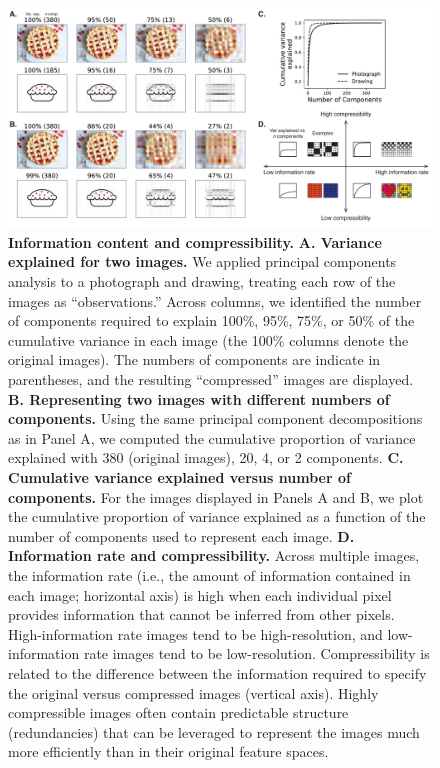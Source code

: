 \documentclass[english]{article}
\begin{document}
\begin{figure}[tp]

  \centering
  \includegraphics[width=\textwidth]{figs/information_and_compressibility}
  
  \caption{\textbf{Information content and compressibility.} \textbf{A. Variance
  explained for two images.} We applied principal components analysis to a
  photograph and drawing, treating each row of the images as ``observations.''
  Across columns, we identified the number of components required to explain
  100\%, 95\%, 75\%, or 50\% of the cumulative variance in each image (the 100\%
  columns denote the original images). The numbers of components are indicate in
  parentheses, and the resulting ``compressed'' images are displayed. \textbf{B.
  Representing two images with different numbers of components.} Using the same
  principal component decompositions as in Panel A, we computed the cumulative
  proportion of variance explained with 380 (original images), 20, 4, or 2
  components. \textbf{C. Cumulative variance explained versus number of
  components.} For the images displayed in Panels A and B, we plot the cumulative
  proportion of variance explained as a function of the number of components used
  to represent each image. \textbf{D. Information rate and compressibility.}
  Across multiple images, the information rate (i.e., the amount of information
  contained in each image; horizontal axis) is high when each individual pixel
  provides information that cannot be inferred from other pixels.
  High-information rate images tend to be high-resolution, and low-information
  rate images tend to be low-resolution. Compressibility is related to the
  difference between the information required to specify the original versus
  compressed images (vertical axis). Highly compressible images often contain
  predictable structure (redundancies) that can be leveraged to represent the
  images much more efficiently than in their original feature spaces.}
  
  \label{fig:information-compression} 
  \end{figure}
\end{document}
